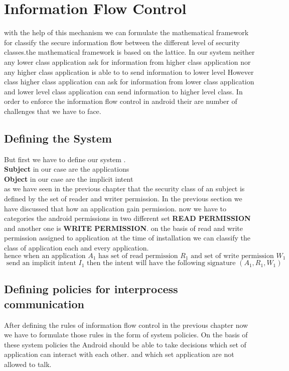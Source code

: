 \documentclass[11pt]{report}
\begin{document}
\chapter{Information Flow Control}
with the help of this mechanism we can formulate the mathematical framework for classify the secure information flow
 between the different level of security classes.the mathematical framework is based on the lattice.
 In our system neither any lower class application ask for information from higher class application nor any higher class application is able to 
to send information to lower level  However class higher class application can ask for information from lower class application and lower 
level class application can send information to higher level class.
In order to enforce the information flow control in android their are number of challenges that we have to face.\\
\section{Defining the System}
But first we have to define our system .\\
\textbf{Subject} in our case are the applications \\
\textbf{Object} in our case are the implicit intent \\
as we have seen in the previous chapter that the security class of an subject is defined by the set of reader and writer permission.
In the previous section we have discussed that how an application gain permission.
now we have to categories the android permissions in two different set 
\textbf{READ PERMISSION} and another one is \textbf{WRITE PERMISSION}.
on the basis of read and write permission assigned to application at the time of installation we can classify the class of application each and 
every application.
\[\textrm{hence when an application }A_1\textrm{ has set of read permission }R_1\textrm{ and set of write permission }W_1\]
\[\textrm{ send an implicit intent }I_1\textrm{ then the intent will have the following signature 
}(A_1,R_1,W_1)\]
\section{Defining policies for interprocess communication}
After defining the rules of information flow control in the previous chapter now we have to formulate those rules in the form of system policies.
On the basis of these system policies the Android should be able to take decisions which set of application can interact with each other.
and which set application are not allowed to talk.
\end{document}
